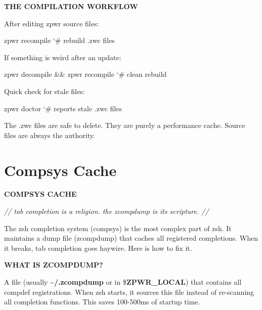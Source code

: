 \documentclass[11pt,a4paper,twoside]{book}
\begin{document}
\vspace{12pt}
{\bfseries\color{neonyellow} THE COMPILATION WORKFLOW}\vspace{4pt}

After editing zpwr source files:

\begin{codebox}
\color{neongreen}zpwr recompile                    {\char`\#} rebuild .zwc files\\
\end{codebox}

If something is weird after an update:

\begin{codebox}
\color{neongreen}zpwr decompile \&\& zpwr recompile  {\char`\#} clean rebuild\\
\end{codebox}

Quick check for stale files:

\begin{codebox}
\color{neongreen}zpwr doctor                       {\char`\#} reports stale .zwc files\\
\end{codebox}

The .zwc files are safe to delete. They are purely a performance cache. Source files are always the authority.


\vspace{16pt}

\section{Compsys Cache}


\vspace{10pt}
{\large\bfseries\color{neoncyan} COMPSYS CACHE}\vspace{6pt}

{\small\itshape\color{dimtext} // tab completion is a religion. the zcompdump is its scripture. //}

The zsh completion system (compsys) is the most complex part of zsh. It maintains a dump file (zcompdump) that caches all registered completions. When it breaks, tab completion goes haywire. Here is how to fix it.


\vspace{12pt}
{\bfseries\color{neonyellow} WHAT IS ZCOMPDUMP?}\vspace{4pt}

A file (usually \textbf{\textasciitilde{}/.zcompdump} or in \$\textbf{ZPWR\_LOCAL}) that contains all compdef registrations. When zsh starts, it sources this file instead of re-scanning all completion functions. This saves 100-500ms of startup time.
\end{document}

